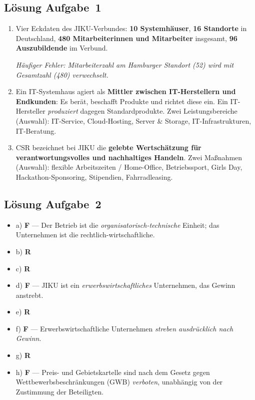 \documentclass[11pt, a4paper]{article}
\begin{document}
\subsection*{Lösung Aufgabe~1}

\begin{enumerate}[label=(\alph*)]
  \item Vier Eckdaten des JIKU-Verbundes: \textbf{10 Systemhäuser}, \textbf{16 Standorte} in
  Deutschland, \textbf{480 Mitarbeiterinnen und Mitarbeiter} insgesamt,
  \textbf{96 Auszubildende} im Verbund.

  \textit{Häufiger Fehler: Mitarbeiterzahl am Hamburger Standort (52) wird mit Gesamtzahl (480) verwechselt.}

  \item Ein IT-Systemhaus agiert als \textbf{Mittler zwischen IT-Herstellern und Endkunden}: Es berät,
  beschafft Produkte und richtet diese ein. Ein IT-Hersteller \emph{produziert} dagegen
  Standardprodukte. Zwei Leistungsbereiche (Auswahl): IT-Service, Cloud-Hosting, Server \& Storage,
  IT-Infrastrukturen, IT-Beratung.

  \item CSR bezeichnet bei JIKU die \textbf{gelebte Wertschätzung für verantwortungsvolles und
  nachhaltiges Handeln}. Zwei Maßnahmen (Auswahl): flexible Arbeitszeiten / Home-Office,
  Betriebssport, Girls Day, Hackathon-Sponsoring, Stipendien, Fahrradleasing.
\end{enumerate}

\subsection*{Lösung Aufgabe~2}

\begin{itemize}
  \item a) \textbf{F} --- Der Betrieb ist die \emph{organisatorisch-technische} Einheit; das Unternehmen ist die rechtlich-wirtschaftliche.
  \item b) \textbf{R}
  \item c) \textbf{R}
  \item d) \textbf{F} --- JIKU ist ein \emph{erwerbswirtschaftliches} Unternehmen, das Gewinn anstrebt.
  \item e) \textbf{R}
  \item f) \textbf{F} --- Erwerbswirtschaftliche Unternehmen \emph{streben ausdrücklich nach Gewinn}.
  \item g) \textbf{R}
  \item h) \textbf{F} --- Preis- und Gebietskartelle sind nach dem Gesetz gegen Wettbewerbsbeschränkungen (GWB) \emph{verboten}, unabhängig von der Zustimmung der Beteiligten.
\end{itemize}
\end{document}
